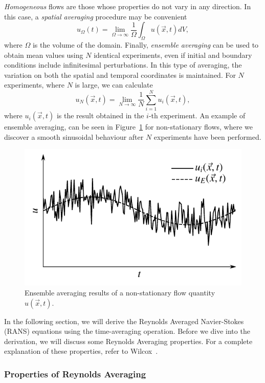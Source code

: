 \textit{Homogeneous} flows are those whose properties do not vary in any direction. In this case, a \textit{spatial averaging} procedure may be convenient
\begin{equation}
	u_\Omega(t) = \lim_{\Omega\rightarrow\infty} \frac{1}{\Omega}\int_\Omega u(\vec{x},t)dV,
\end{equation}
where $\Omega$ is the volume of the domain. Finally, \textit{ensemble averaging} can be used to obtain mean values using $N$ identical experiments, even if initial and boundary conditions include infinitesimal perturbations. In this type of averaging, the variation on both the spatial and temporal coordinates is maintained. For $N$ experiments, where $N$ is large, we can calculate
\begin{equation}
	u_N(\vec{x},t) = \lim_{N\rightarrow\infty} \frac{1}{N} \sum_{i=1}^N u_i(\vec{x},t),
\end{equation}
where $u_i({\vec{x},t})$ is the result obtained in the $i$-th experiment. An example of ensemble averaging, can be seen in Figure~\ref{fig:ensemble_averaging} for non-stationary flows, where we discover a smooth sinusoidal behaviour after $N$ experiments have been performed. 

\begin{figure}[htbp]
	\centering
	\includegraphics[width=0.6\linewidth]{Pictures/ensemble_averaging}
	\caption{Ensemble averaging results of a non-stationary flow quantity $u(\vec{x},t).$}
	\label{fig:ensemble_averaging}
\end{figure}

In the following section, we will derive the Reynolds Averaged Navier-Stokes (RANS) equations using the time-averaging operation. Before we dive into the derivation, we will discuss some Reynolds Averaging properties. For a complete explanation of these properties, refer to Wilcox~\cite{wilcox1998turbulence}. 

\subsubsection{Properties of Reynolds Averaging}

